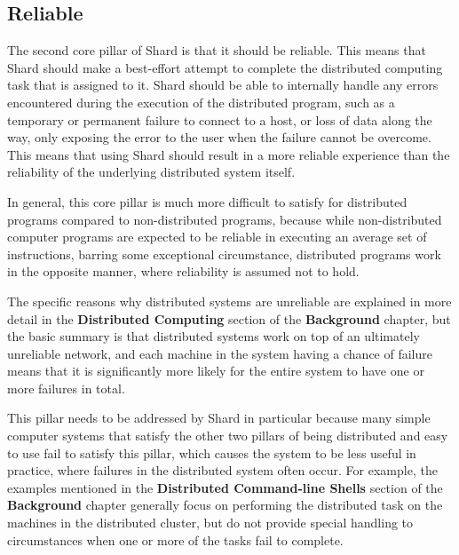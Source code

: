 \documentclass[twoside]{report}
\begin{document}
\subsection{Reliable}

The second core pillar of Shard is that it should be reliable.
This means that Shard should make a best-effort attempt to complete the distributed computing task that is assigned to it.
Shard should be able to internally handle any errors encountered during the execution of the distributed program, such as a temporary or permanent failure to connect to a host, or loss of data along the way, only exposing the error to the user when the failure cannot be overcome.
This means that using Shard should result in a more reliable experience than the reliability of the underlying distributed system itself.

In general, this core pillar is much more difficult to satisfy for distributed programs compared to non-distributed programs, because while non-distributed computer programs are expected to be reliable in executing an average set of instructions, barring some exceptional circumstance, distributed programs work in the opposite manner, where reliability is assumed not to hold.

The specific reasons why distributed systems are unreliable are explained in more detail in the \textbf{Distributed Computing} section of the \textbf{Background} chapter, but the basic summary is that distributed systems work on top of an ultimately unreliable network, and each machine in the system having a chance of failure means that it is significantly more likely for the entire system to have one or more failures in total.

This pillar needs to be addressed by Shard in particular because many simple computer systems that satisfy the other two pillars of being distributed and easy to use fail to satisfy this pillar, which causes the system to be less useful in practice, where failures in the distributed system often occur.
For example, the examples mentioned in the \textbf{Distributed Command-line Shells} section of the \textbf{Background} chapter generally focus on performing the distributed task on the machines in the distributed cluster, but do not provide special handling to circumstances when one or more of the tasks fail to complete.
\end{document}
